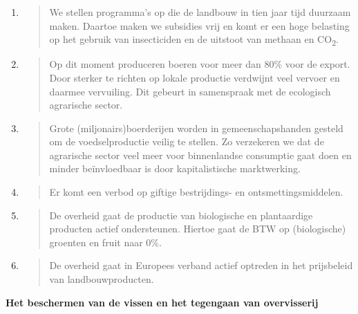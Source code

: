 \begin{enumerate}
\def\labelenumi{\arabic{enumi}.}
\item
  \begin{quote}
  We stellen programma's op die de landbouw in tien jaar tijd duurzaam
  maken. Daartoe maken we subsidies vrij en komt er een hoge belasting
  op het gebruik van insecticiden en de uitstoot van methaan en
  CO\textsubscript{2}.
  \end{quote}
\item
  \begin{quote}
  Op dit moment produceren boeren voor meer dan 80\% voor de export.
  Door sterker te richten op lokale productie verdwijnt veel vervoer en
  daarmee vervuiling. Dit gebeurt in samenspraak met de ecologisch
  agrarische sector.
  \end{quote}
\item
  \begin{quote}
  Grote (miljonairs)boerderijen worden in gemeenschapshanden gesteld om
  de voedselproductie veilig te stellen. Zo verzekeren we dat de
  agrarische sector veel meer voor binnenlandse consumptie gaat doen en
  minder beïnvloedbaar is door kapitalistische marktwerking.
  \end{quote}
\item
  \begin{quote}
  Er komt een verbod op giftige bestrijdings- en ontsmettingsmiddelen.
  \end{quote}
\item
  \begin{quote}
  De overheid gaat de productie van biologische en plantaardige
  producten actief ondersteunen. Hiertoe gaat de BTW op (biologische)
  groenten en fruit naar 0\%.
  \end{quote}
\item
  \begin{quote}
  De overheid gaat in Europees verband actief optreden in het
  prijsbeleid van landbouwproducten.
  \end{quote}
\end{enumerate}

\textbf{Het beschermen van de vissen en het tegengaan van overvisserij}

